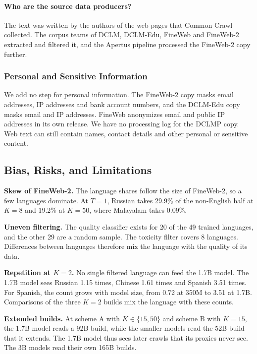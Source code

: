 \paragraph{Who are the source data producers?}

The text was written by the authors of the web pages that Common Crawl collected. The corpus teams of DCLM, DCLM-Edu, FineWeb and FineWeb-2 extracted and filtered it, and the Apertus pipeline processed the FineWeb-2 copy further.

\subsubsection*{Personal and Sensitive Information}

We add no step for personal information. The FineWeb-2 copy masks email addresses, IP addresses and bank account numbers, and the DCLM-Edu copy masks email and IP addresses. FineWeb anonymizes email and public IP addresses in its own release. We have no processing log for the DCLMP copy. Web text can still contain names, contact details and other personal or sensitive content.

\subsection*{Bias, Risks, and Limitations}

\textbf{Skew of FineWeb-2.} The language shares follow the size of FineWeb-2, so a few languages dominate. At $T=1$, Russian takes 29.9\% of the non-English half at $K=8$ and 19.2\% at $K=50$, where Malayalam takes 0.09\%.

\textbf{Uneven filtering.} The quality classifier exists for 20 of the 49 trained languages, and the other 29 are a random sample. The toxicity filter covers 8 languages. Differences between languages therefore mix the language with the quality of its data.

\textbf{Repetition at $K=2$.} No single filtered language can feed the 1.7B model. The 1.7B model sees Russian 1.15 times, Chinese 1.61 times and Spanish 3.51 times. For Spanish, the count grows with model size, from 0.72 at 350M to 3.51 at 1.7B. Comparisons of the three $K=2$ builds mix the language with these counts.

\textbf{Extended builds.} At scheme A with $K \in \{15, 50\}$ and scheme B with $K=15$, the 1.7B model reads a 92B build, while the smaller models read the 52B build that it extends. The 1.7B model thus sees later crawls that its proxies never see. The 3B models read their own 165B builds.

